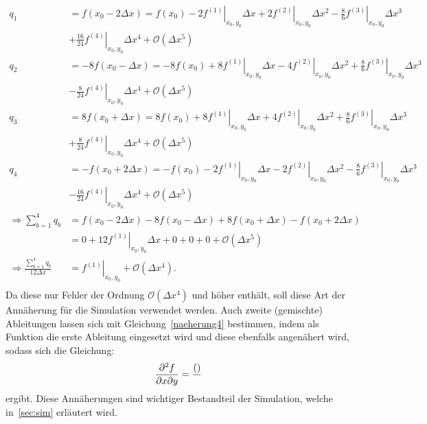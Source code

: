 \begin{align*}
    q_1 &= f(x_0 -2\Delta x) = f(x_0) -2\left.f^{(1)}\right\vert_{x_0,y_0} \Delta x + 2 \left.f^{(2)}\right\vert_{x_0,y_0} \Delta x^2 - \frac{8}{6} \left.f^{(3)}\right\vert_{x_0,y_0} \Delta x^3 \\
    &+ \frac{16}{24}\left.f^{(4)}\right\vert_{x_0,y_0} \Delta x^4 + \mathcal{O}(\Delta x ^5) \\
    q_2 &= -8f(x_0 -\Delta x) = -8f(x_0)+8\left.f^{(1)}\right\vert_{x_0,y_0} \Delta x -4 \left.f^{(2)}\right\vert_{x_0,y_0} \Delta x^2 + \frac{8}{6} \left.f^{(3)}\right\vert_{x_0,y_0} \Delta x^3 \\
    &- \frac{8}{24}\left.f^{(4)}\right\vert_{x_0,y_0} \Delta x ^4+ \mathcal{O}(\Delta x ^5) \\
    q_3 &= 8f(x_0 +\Delta x) = 8f(x_0) +8\left.f^{(1)}\right\vert_{x_0,y_0} \Delta x +4 \left.f^{(2)}\right\vert_{x_0,y_0} \Delta x^2 + \frac{8}{6} \left.f^{(3)}\right\vert_{x_0,y_0} \Delta x^3 \\
    &+ \frac{8}{24}\left.f^{(4)}\right\vert_{x_0,y_0} \Delta x ^4+ \mathcal{O}(\Delta x ^5) \\
    q_4 &= -f(x_0 +2\Delta x) = -f(x_0) -2\left.f^{(1)}\right\vert_{x_0,y_0} \Delta x -2 \left.f^{(2)}\right\vert_{x_0,y_0} \Delta x^2 - \frac{8}{6} \left.f^{(3)}\right\vert_{x_0,y_0} \Delta x^3 \\
    &- \frac{16}{24}\left.f^{(4)}\right\vert_{x_0,y_0} \Delta x^4 + \mathcal{O}(\Delta x ^5) \\
    \Rightarrow \sum_{b=1}^{4} q_b &= f(x_0-2\Delta x) - 8f(x_0 - \Delta x) + 8f(x_0 + \Delta x) - f(x_0 + 2\Delta x) \\
    &= 0 + 12 \left.f^{(1)}\right\vert_{x_0 , y_0} \Delta x + 0 + 0 + 0 + \mathcal{O}(\Delta x^5) \\
    \Rightarrow \frac{\sum_{b=1}^{4} q_b}{12\Delta x} &= \left.f^{(1)}\right\vert_{x_0 , y_0} + \mathcal{O}(\Delta x^4). \\
\end{align*}
Da diese nur Fehler der Ordnung $\mathcal{O}(\Delta x^4)$ und höher enthält, soll diese Art der Annäherung für die Simulation verwendet werden.
Auch zweite (gemischte) Ableitungen lassen sich mit Gleichung~\ref{naeherung4} bestimmen, indem als Funktion die erste Ableitung eingesetzt wird und diese ebenfalls angenähert wird, sodass sich die Gleichung:
\begin{align*}
    \pdsu{f}{x}{y} &= \frac{\left( \right)}{} \\ %
\end{align*}
ergibt.
Diese Annäherungen sind wichtiger Bestandteil der Simulation, welche in~\autoref{sec:sim} erläutert wird.

